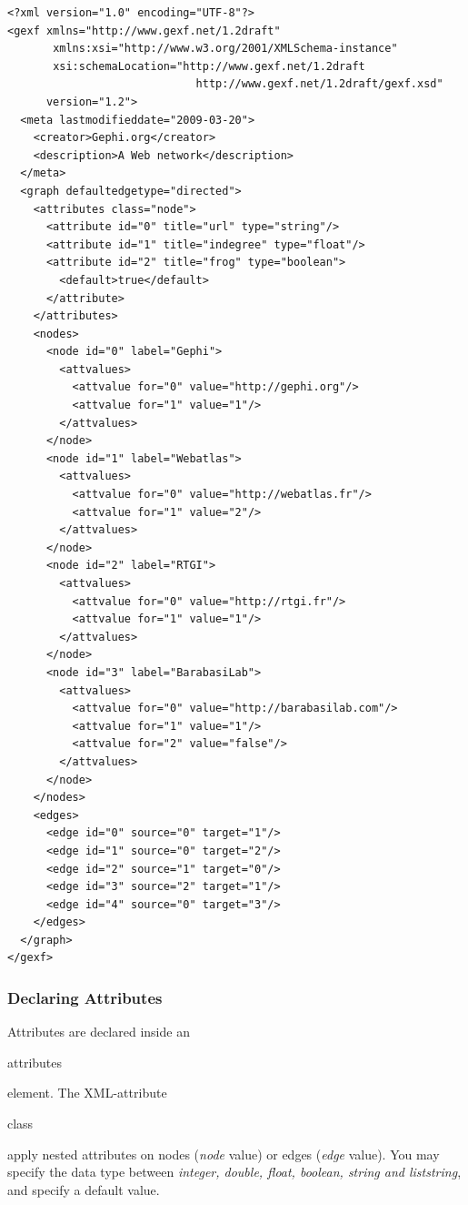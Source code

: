 \documentclass[a4paper,10pt]{article}
\begin{document}
\lstset{ style=gexf }
\begin{lstlisting}[caption={A (small) Web Graph},label=webgraph]
<?xml version="1.0" encoding="UTF-8"?>
<gexf xmlns="http://www.gexf.net/1.2draft"
       xmlns:xsi="http://www.w3.org/2001/XMLSchema-instance"
       xsi:schemaLocation="http://www.gexf.net/1.2draft
                             http://www.gexf.net/1.2draft/gexf.xsd"
      version="1.2">
  <meta lastmodifieddate="2009-03-20">
    <creator>Gephi.org</creator>
    <description>A Web network</description>
  </meta>
  <graph defaultedgetype="directed">
    <attributes class="node">
      <attribute id="0" title="url" type="string"/>
      <attribute id="1" title="indegree" type="float"/>
      <attribute id="2" title="frog" type="boolean">
        <default>true</default>
      </attribute>
    </attributes>
    <nodes>
      <node id="0" label="Gephi">
        <attvalues>
          <attvalue for="0" value="http://gephi.org"/>
          <attvalue for="1" value="1"/>
        </attvalues>
      </node>
      <node id="1" label="Webatlas">
        <attvalues>
          <attvalue for="0" value="http://webatlas.fr"/>
          <attvalue for="1" value="2"/>
        </attvalues>
      </node>
      <node id="2" label="RTGI">
        <attvalues>
          <attvalue for="0" value="http://rtgi.fr"/>
          <attvalue for="1" value="1"/>
        </attvalues>
      </node>
      <node id="3" label="BarabasiLab">
        <attvalues>
          <attvalue for="0" value="http://barabasilab.com"/>
          <attvalue for="1" value="1"/>
          <attvalue for="2" value="false"/>
        </attvalues>
      </node>
    </nodes>
    <edges>
      <edge id="0" source="0" target="1"/>
      <edge id="1" source="0" target="2"/>
      <edge id="2" source="1" target="0"/>
      <edge id="3" source="2" target="1"/>
      <edge id="4" source="0" target="3"/>
    </edges>
  </graph>
</gexf>
\end{lstlisting}


\subsubsection{Declaring Attributes}

Attributes are declared inside an \begin{footnotesize}attributes\end{footnotesize} element. The XML-attribute \begin{footnotesize}class\end{footnotesize} apply nested attributes on nodes (\textit{node} value) or edges (\textit{edge} value). You may specify the data type between \textit{integer, double, float, boolean, string and liststring}, and specify a default value.
\end{document}
